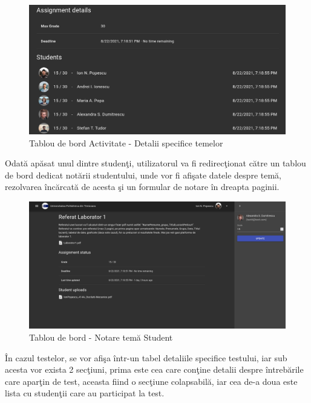 \documentclass[12pt, a4paper, oneside, romanian]{teza-upb}
\begin{document}
\begin{figure}[H]
\centering
\includegraphics*[width=\columnwidth]{tablou-de-bord-activitate-detalii-specifice-temelor}
\caption{Tablou de bord Activitate - Detalii specifice temelor}
\label{tablou-de-bord-activitate-detalii-specifice-temelor}
\end{figure}

Odată apăsat unul dintre studenţi, utilizatorul va fi redirecţionat către un tablou de bord dedicat notării studentului, unde vor fi afişate datele despre temă, rezolvarea încărcată de acesta şi un formular de notare în dreapta paginii.

\begin{figure}[H]
\centering
\includegraphics*[width=\columnwidth]{tablou-de-bord-notare-tema-student}
\caption{Tablou de bord - Notare temă Student}
\label{tablou-de-bord-notare-tema-student}
\end{figure}

În cazul testelor, se vor afişa într-un tabel detaliile specifice testului, iar sub acesta vor exista 2 secţiuni, prima este cea care conţine detalii despre întrebările care aparţin de test, aceasta fiind o secţiune colapsabilă, iar cea de-a doua este lista cu studenţii care au participat la test.
\end{document}
